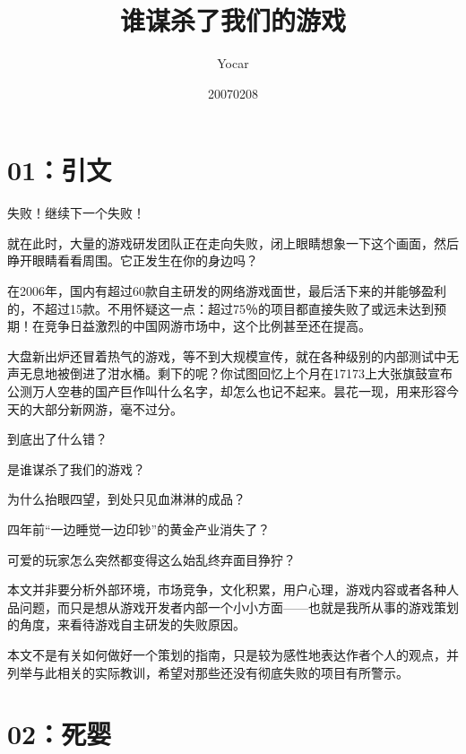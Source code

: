 \documentclass{article}
\title{谁谋杀了我们的游戏}
\author{Yocar}
\date{20070208}
\begin{document}



\Large



{\centering\section*{01：引文}}





失败！继续下一个失败！



就在此时，大量的游戏研发团队正在走向失败，闭上眼睛想象一下这个画面，然后睁开眼睛看看周围。它正发生在你的身边吗？



在2006年，国内有超过60款自主研发的网络游戏面世，最后活下来的并能够盈利的，不超过15款。不用怀疑这一点：超过75％的项目都直接失败了或远未达到预期！在竞争日益激烈的中国网游市场中，这个比例甚至还在提高。



大盘新出炉还冒着热气的游戏，等不到大规模宣传，就在各种级别的内部测试中无声无息地被倒进了泔水桶。剩下的呢？你试图回忆上个月在17173上大张旗鼓宣布公测万人空巷的国产巨作叫什么名字，却怎么也记不起来。昙花一现，用来形容今天的大部分新网游，毫不过分。



到底出了什么错？



是谁谋杀了我们的游戏？



为什么抬眼四望，到处只见血淋淋的成品？



四年前“一边睡觉一边印钞”的黄金产业消失了？



可爱的玩家怎么突然都变得这么始乱终弃面目狰狞？



本文并非要分析外部环境，市场竞争，文化积累，用户心理，游戏内容或者各种人品问题，而只是想从游戏开发者内部一个小小方面——也就是我所从事的游戏策划的角度，来看待游戏自主研发的失败原因。



本文不是有关如何做好一个策划的指南，只是较为感性地表达作者个人的观点，并列举与此相关的实际教训，希望对那些还没有彻底失败的项目有所警示。





{\centering\section*{02：死婴}}
\end{document}
